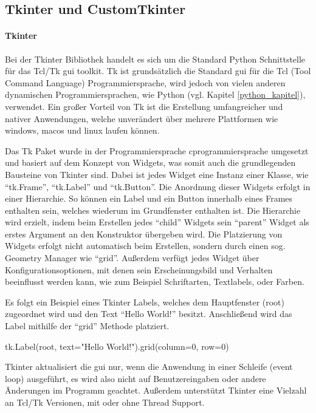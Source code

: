 \subsection{Tkinter und CustomTkinter}\label{tkinter_kapitel}
\paragraph{Tkinter}
Bei der Tkinter Bibliothek handelt es sich um die Standard Python Schnittstelle für das Tcl/Tk \ac{gui} toolkit. Tk ist grundsätzlich die Standard \acs{gui} für die Tcl (Tool Command Language) Programmiersprache, wird jedoch von vielen anderen dynamischen Programmiersprachen, wie \zB Python (vgl. Kapitel \ref{python_kapitel}), verwendet. Ein großer Vorteil von Tk ist die Erstellung umfangreicher und nativer Anwendungen, welche unverändert über mehrere Plattformen wie windows, macos und linux laufen können. \cite[vgl.][]{Python_Software_Foundation_Tk:o.J., Tcl_Developer_Xchange:o.J.}

Das Tk Paket wurde in der Programmiersprache cprogrammiersprache umgesetzt und basiert auf dem Konzept von Widgets, was somit auch die grundlegenden Bausteine von Tkinter sind. Dabei ist jedes Widget eine Instanz einer Klasse, wie \zB \enquote{tk.Frame}, \enquote{tk.Label} und \enquote{tk.Button}. Die Anordnung dieser Widgets erfolgt in einer Hierarchie. So können \zB ein Label und ein Button innerhalb eines Frames enthalten sein, welches wiederum im Grundfenster enthalten ist. Die Hierarchie wird erzielt, indem beim Erstellen jedes \enquote{child} Widgets sein \enquote{parent} Widget als erstes Argument an den Konstruktor übergeben wird. Die Platzierung von Widgets erfolgt nicht automatisch beim Erstellen, sondern durch einen sog. Geometry Manager wie \enquote{grid}. Außerdem verfügt jedes Widget über Konfigurationsoptionen, mit denen sein Erscheinungsbild und Verhalten beeinflusst werden kann, wie zum Beispiel Schriftarten, Textlabels, oder Farben. \cite[vgl.][]{Python_Software_Foundation_Tk:o.J., Shipman:2013}

Es folgt ein Beispiel eines Tkinter Labels, welches dem Hauptfenster (root) zugeordnet wird und den Text \enquote{Hello World!} besitzt. Anschließend wird das Label mithilfe der \enquote{grid} Methode platziert. 
\begin{pythoncode}
	tk.Label(root, text="Hello World!").grid(column=0, row=0)
\end{pythoncode}

Tkinter aktualisiert die \acs{gui} nur, wenn die Anwendung in einer Schleife (event loop) ausgeführt, es wird also nicht auf Benutzereingaben oder andere Änderungen im Programm geachtet. Außerdem unterstützt Tkinter eine Vielzahl an Tcl/Tk Versionen, mit oder ohne Thread Support.


